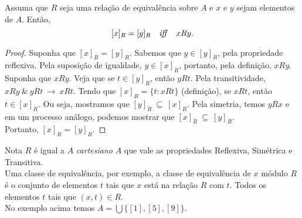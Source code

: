          \begin{theorem}
            Assuma que $R$ seja uma relação de equivalência sobre $A$ e $x$ e $y$ sejam elementos de $A$.
            Então,
            $$[x]_{R} = [y]_{R}\quad \textrm{\emph{iff}}\quad xRy.$$
            \begin{proof}
               Suponha que $[x]_{R} = [y]_{R}$. Sabemos que $y \in [y]_{R}$, pela propriedade reflexiva. Pela suposição de igualdade, $y \in [x]_{R}$, portanto, pela definição, $xRy$.
               Suponha que $xRy$. Veja que se $t \in [y]_{R}$, então $yRt$. Pela transitividade, $xRy\ \&\ yRt\ \rightarrow\ xRt$.
               Tendo que $[x]_{R} = \{t: xRt\}$ (definição), se $xRt$, então $t \in [x]_{R}$. Ou seja, mostramos que $[y]_{R}\ \subseteq\ [x]_{R}$.
               Pela simetria, temos $yRx$ e em um processo análogo, podemos mostrar que $[x]_{R}\ \subseteq\ [y]_{R}$.\\
               Portanto, $[x]_{R} = [y]_{R}$.
            \end{proof}
         \end{theorem}
         \begin{mymdframed}{Nota}  
            $R$ é igual a $A$ \emph{cartesiano} $A$ que vale as propriedades Reflexiva, Simétrica e Transitiva.\\
            Uma classe de equivalência, por exemplo, a classe de equivalência de $x$ módulo $R$ é o conjunto de elementos $t$ tais que $x$ está na relação $R$ com $t$. Todos os elementos $t$ tais que $( x, t ) \in R$.\\
            No exemplo acima temos $A = \bigcup\{[1], [5], [9]\}$.
         \end{mymdframed}

